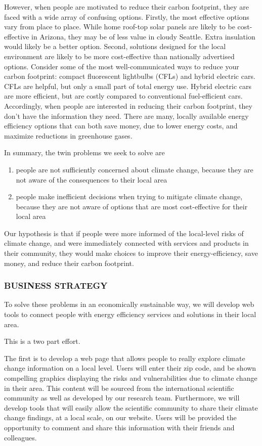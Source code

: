 \documentclass[12pt]{article}
\begin{document}
However, when people are motivated to reduce their carbon footprint,
they are faced with a wide array of confusing options. Firstly, the
most effective options vary from place to place. While home roof-top
solar panels are likely to be cost-effective in Arizona, they may be
of less value in cloudy Seattle. Extra insulation would likely be a
better option. Second, solutions designed for the local environment
are likely to be more cost-effective than nationally advertised
options. Consider some of the most well-communicated ways to reduce
your carbon footprint: compact fluorescent lightbulbs (CFLs) and hybrid
electric cars. CFLs are helpful, but only a small part of total energy
use. Hybrid electric cars are more efficient, but are costly compared
to conventional fuel-efficient cars. Accordingly, when people are
interested in reducing their carbon footprint, they don't have the
information they need. There are many, locally available energy
efficiency options that can both save money, due to lower energy
costs, and maximize reductions in greenhouse gases.


In summary, the twin problems we seek to solve are 
\begin{enumerate}
\item people are not sufficiently concerned about climate change,
  because they are not aware of the consequences to their local area
\item people make inefficient decisions when trying to mitigate
  climate change, because they are not aware of options that are most
  cost-effective for their local area
\end{enumerate}

Our hypothesis is that if people were more informed of the local-level
risks of climate change, and were immediately connected with services
and products in their community, they would make choices to improve
their energy-efficiency, save money, and reduce their carbon
footprint.

\subsubsection*{BUSINESS STRATEGY}

To solve these problems in an economically sustainable way, we will
develop web tools to connect people with energy efficiency services
and solutions in their local area.

This is a two part effort.

The first is to develop a web page that allows people to really
explore climate change information on a local level. Users will enter
their zip code, and be shown compelling graphics displaying the risks
and vulnerabilities due to climate change in their area. This content
will be sourced from the international scientific community as well as
developed by our research team. Furthermore, we will develop tools
that will easily allow the scientific community to share their climate
change findings, at a local scale, on our website. Users will be
provided the opportunity to comment and share this information with
their friends and colleagues.
\end{document}
